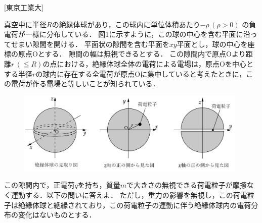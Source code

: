 

\noindent {} [東京工業大]

真空中に半径$R$の絶縁体球があり，この球内に単位体積あたり$- \rho\, (\rho > 0)$ の負電荷が一様に分布している．
図1に示すように，この球の中心を含む平面に沿ってせまい隙間を開ける．
平面状の隙間を含む平面を$xy$平面とし，球の中心を座標の原点Oとする．
隙間の幅は無視できるとする．
この隙間内で原点Oより距離$r \, ( \leqq R)$の点における，絶縁体球全体の電荷による電場は，原点Oを中心とする半径$r$の球内に存在する全電荷が原点Oに集中していると考えたときに，この電荷が作る電場と等しいことが知られている．

\begin{figure}[H]
  \centering
  \includegraphics[width=11cm]{fig/fig_4_3_1.pdf}
  \caption{}
\end{figure}

この隙間内で，正電荷$q$を持ち，質量$m$で大きさの無視できる荷電粒子が摩擦なく運動する．以下の問いに答えよ．
ただし，重力の影響を無視し，この荷電粒子は絶縁体球と絶縁されており，この荷電粒子の運動に伴う絶縁体球内の電荷分布の変化はないものとする．

